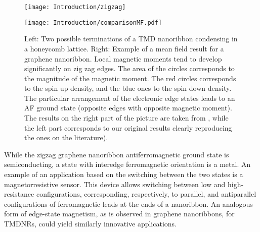 \begin{figure}[H]
\vspace{-1cm}
\hspace{0.5cm}
\begin{minipage}[c]{0.1\textwidth}
\texttt{[image: Introduction/zigzag]}
\end{minipage} \hspace{4.2cm}
\begin{minipage}[c]{0.1\textwidth}
\vspace{0.3cm}
\texttt{[image: Introduction/comparisonMF.pdf]}
\end{minipage}
\vspace{-0.5cm}
 \caption[Zigzag edges of a nanoribbon and magnetism.]{Left: Two possible terminations of a \ac{TMD} nanoribbon condensing in a honeycomb lattice.
Right: Example of a mean field result for a  graphene nanoribbon.
Local magnetic moments tend to develop significantly on zig zag edges.
The area of the circles corresponds to the magnitude of the magnetic moment.
The red circles corresponds to the spin up density, and the blue ones to the spin down density.
The particular arrangement of the electronic edge states leads to an \ac{AF} ground state (opposite edges with opposite magnetic moment). The results on the right part of the picture are taken from \cite{yazyev_emergence_2010}, while the left part corresponds to our original results clearly reproducing the ones on the literature). \label{fig:nanoribbons}}
\end{figure}

While the zigzag graphene nanoribbon antiferromagnetic ground state is semiconducting, a state with interedge ferromagnetic orientation is a metal.
An example of an application based on the switching between the two states is a magnetorresistive sensor.
This device allows switching between low and high-resistance configurations, corresponding, respectively, to parallel, and antiparallel configurations of ferromagnetic leads at the ends of a nanoribbon.
An analogous form of edge-state magnetism, as is observed in graphene nanoribbons, for \acp{TMDNR}, could yield similarly innovative applications.